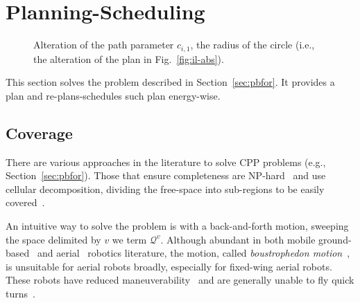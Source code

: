 \documentclass[letterpaper,10pt,journal,twoside]{IEEEtran}
\newcommand{\figpath}{./figures}
\theoremstyle{definition}
\begin{document}
\vspace*{-1.4ex}
\section{Planning-Scheduling}  %
\label{sec:algo}               %
\begin{figure}[t]
  \footnotesize
  \begin{minipage}[l]{0.25\columnwidth}
    \caption{Alteration of the path parameter $c_{i,1}$, the radius of the circle (i.e., the alteration of the plan in Fig.~\ref{fig:il-abs}).
    }
    \label{fig:tee1}
  \end{minipage}\hfill
  \begin{minipage}[c]{0.7\columnwidth}
    \centering
    \vspace*{-4.5ex}
    
  \end{minipage}
  \vspace*{-4.5ex}
\end{figure}

This section solves the problem described in Section~\ref{sec:pbfor}. It provides a plan %
and re-plans-schedules such plan energy-wise. %

\vspace*{-1.4ex}
\subsection{Coverage}
\label{sec:cov-algo}

There are various approaches in the literature to solve CPP problems (e.g., Section~\ref{sec:pbfor}). Those that ensure %
completeness %
are NP-hard~\cite{arkin2000approximation} and use cellular decomposition, dividing the free-space into sub-regions to be easily covered~\cite{choset2001coverage,galceran2013survey}.

An intuitive way to solve the problem is with a back-and-forth motion, sweeping the space delimited by $v$ we term $\mathcal{Q}^v$. Although abundant in both mobile ground-based~\cite{choset2001coverage,%
lavalle2006planning} and aerial~\cite{araujo2013multiple,%
cabreira2018energy,difranco2015energy} robotics literature, the motion, called \emph{boustrophedon motion}~\cite{choset2001coverage}, is unsuitable for aerial robots broadly, especially for fixed-wing aerial robots. These robots have reduced maneuverability~\cite{dille2013efficient,mannadiar2010optimal,%
xu2014efficient} and are generally unable to fly quick turns~\cite{wang2017curvature}.
\end{document}
